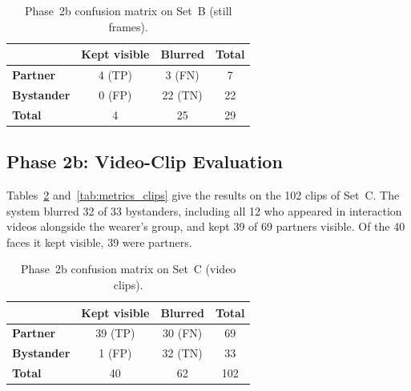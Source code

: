 \begin{table}[htbp]
\begin{singlespace}
\centering
\caption{Phase~2b confusion matrix on Set~B (still frames).}
\label{tab:confusion_2b}
\renewcommand{\arraystretch}{1.3}
\begin{tabular}{@{}lccc@{}}
\toprule
 & \textbf{Kept visible} & \textbf{Blurred} & \textbf{Total} \\
\midrule
\textbf{Partner}   & 4 (TP) & 3 (FN)  & 7 \\
\textbf{Bystander} & 0 (FP) & 22 (TN) & 22 \\
\textbf{Total}     & 4      & 25      & 29 \\
\bottomrule
\end{tabular}
\end{singlespace}
\end{table}

\subsection{Phase 2b: Video-Clip Evaluation}
\label{sec:res_clips}

Tables~\ref{tab:confusion_clips} and~\ref{tab:metrics_clips} give the results on the 102
clips of Set~C. The system blurred 32 of 33 bystanders, including all 12 who appeared in
interaction videos alongside the wearer's group, and kept 39 of 69 partners visible. Of
the 40 faces it kept visible, 39 were partners.

\begin{table}[htbp]
\begin{singlespace}
\centering
\caption{Phase~2b confusion matrix on Set~C (video clips).}
\label{tab:confusion_clips}
\renewcommand{\arraystretch}{1.3}
\begin{tabular}{@{}lccc@{}}
\toprule
 & \textbf{Kept visible} & \textbf{Blurred} & \textbf{Total} \\
\midrule
\textbf{Partner}   & 39 (TP) & 30 (FN) & 69 \\
\textbf{Bystander} & 1 (FP)  & 32 (TN) & 33 \\
\textbf{Total}     & 40      & 62      & 102 \\
\bottomrule
\end{tabular}
\end{singlespace}
\end{table}

